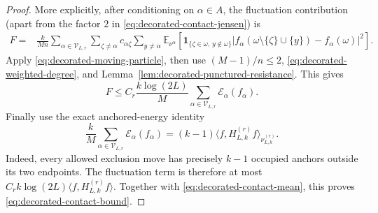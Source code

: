 \documentclass[11pt]{article}
\numberwithin{equation}{section}
\theoremstyle{remark}
\newcommand{\1}{\mathbf 1}
\begin{document}
\begin{proof}
More explicitly, after conditioning on \(\alpha\in A\), the
fluctuation contribution (apart from the factor \(2\) in
\eqref{eq:decorated-contact-jensen}) is
\begin{align}
 F={}&\frac{k}{Mn}
 \sum_{\alpha\in\mathcal V_{L,r}}
 \sum_{\zeta\ne\alpha}c_{\alpha\zeta}
 \sum_{y\ne\alpha}
 \mathbb E_{\nu^\alpha}\!\left[
 \1_{\{\zeta\in\omega,\,y\notin\omega\}}
 |f_\alpha(\omega\setminus\{\zeta\}\cup\{y\})
     -f_\alpha(\omega)|^2\right].
 \label{eq:decorated-conditioned-fluctuation}
\end{align}
Apply \eqref{eq:decorated-moving-particle}, then use
\((M-1)/n\leq2\), \eqref{eq:decorated-weighted-degree}, and
Lemma~\ref{lem:decorated-punctured-resistance}.  This gives
\begin{equation}
 F\leq C_r\frac{k\log(2L)}M
 \sum_{\alpha\in\mathcal V_{L,r}}\mathcal E_\alpha(f_\alpha).
 \label{eq:decorated-fluctuation-before-anchor}
\end{equation}
Finally use the exact anchored-energy identity
\begin{equation}
 \frac{k}{M}\sum_{\alpha\in\mathcal V_{L,r}}
 \mathcal E_\alpha(f_\alpha)
 =(k-1)\langle f,H_{L,k}^{(r)}f\rangle_{\nu_{L,k}^{(r)}}.
 \label{eq:decorated-anchored-energy}
\end{equation}
Indeed, every allowed exclusion move has precisely \(k-1\) occupied
anchors outside its two endpoints.  The fluctuation term is therefore at
most \(C_rk\log(2L)\langle f,H_{L,k}^{(r)}f\rangle\).  Together with
\eqref{eq:decorated-contact-mean}, this proves
\eqref{eq:decorated-contact-bound}.
\end{proof}
\end{document}
